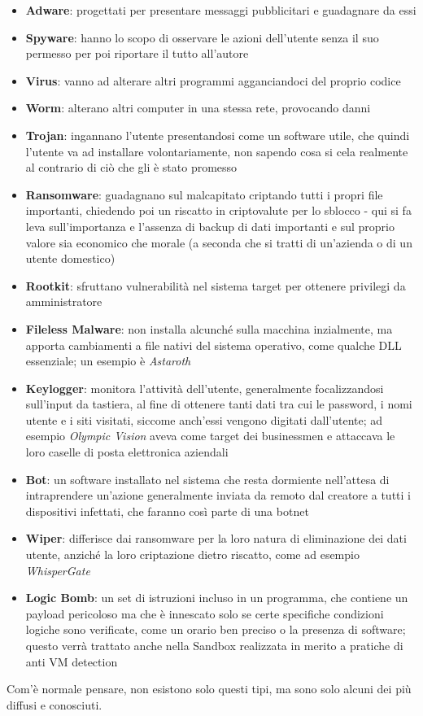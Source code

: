 \begin{itemize}
    \item \textbf{Adware}: progettati per presentare messaggi pubblicitari e guadagnare da essi
    \item \textbf{Spyware}: hanno lo scopo di osservare le azioni dell'utente senza il suo permesso per poi riportare il tutto all'autore
    \item \textbf{Virus}: vanno ad alterare altri programmi agganciandoci del proprio codice
    \item \textbf{Worm}: alterano altri computer in una stessa rete, provocando danni
    \item \textbf{Trojan}: ingannano l'utente presentandosi come un software utile, che quindi l'utente va ad installare volontariamente, non sapendo cosa si cela realmente al contrario di ciò che gli è stato promesso
    \item \textbf{Ransomware}: guadagnano sul malcapitato criptando tutti i propri file importanti, chiedendo poi un riscatto in criptovalute per lo sblocco - qui si fa leva sull'importanza e l'assenza di backup di dati importanti e sul proprio valore sia economico che morale (a seconda che si tratti di un'azienda o di un utente domestico)
    \item \textbf{Rootkit}: sfruttano vulnerabilità nel sistema target per ottenere privilegi da amministratore
    \item \textbf{Fileless Malware}: non installa alcunché sulla macchina inzialmente, ma apporta cambiamenti a file nativi del sistema operativo, come qualche DLL essenziale; un esempio è \emph{Astaroth}
    \item \textbf{Keylogger}: monitora l'attività dell'utente, generalmente focalizzandosi sull'input da tastiera, al fine di ottenere tanti dati tra cui le password, i nomi utente e i siti visitati, siccome anch'essi vengono digitati dall'utente; ad esempio \emph{Olympic Vision} aveva come target dei businessmen e attaccava le loro caselle di posta elettronica aziendali
    \item \textbf{Bot}: un software installato nel sistema che resta dormiente nell'attesa di intraprendere un'azione generalmente inviata da remoto dal creatore a tutti i dispositivi infettati, che faranno così parte di una botnet
    \item \textbf{Wiper}: differisce dai ransomware per la loro natura di eliminazione dei dati utente, anziché la loro criptazione dietro riscatto, come ad esempio \emph{WhisperGate}
    \item \textbf{Logic Bomb}: un set di istruzioni incluso in un programma, che contiene un payload pericoloso ma che è innescato solo se certe specifiche condizioni logiche sono verificate, come un orario ben preciso o la presenza di software; questo verrà trattato anche nella Sandbox realizzata in merito a pratiche di anti VM detection
\end{itemize}
Com'è normale pensare, non esistono solo questi tipi, ma sono solo alcuni dei più diffusi e conosciuti.

